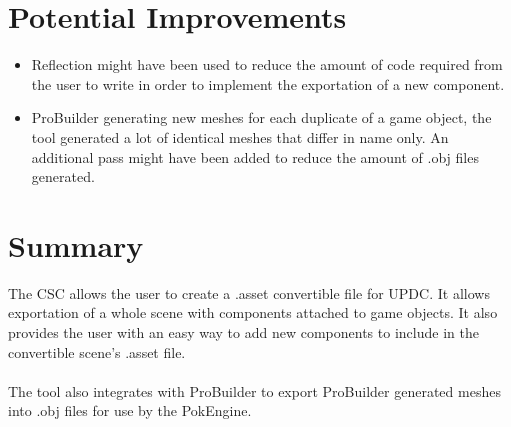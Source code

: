\documentclass[12pt,a4paper]{article}
\begin{document}
\section{Potential Improvements}
\begin{itemize}
\item Reflection might have been used to reduce the amount of code required from the user to write in order to implement the exportation of a new component.
\item ProBuilder generating new meshes for each duplicate of a game object, the tool generated a lot of identical meshes that differ in name only. An additional pass might have been added to reduce the amount of .obj files generated.
\end{itemize}

\section{Summary}
The CSC allows the user to create a .asset convertible file for UPDC. It allows exportation of a whole scene with components attached to game objects. It also provides the user with an easy way to add new components to include in the convertible scene's .asset file.\\\\
The tool also integrates with ProBuilder to export ProBuilder generated meshes into .obj files for use by the PokEngine.
\end{document}
